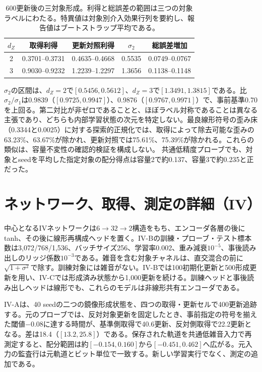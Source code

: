 \begin{table}[h]
\centering\small
\caption{600更新後の三対象形成。利得と総誤差の範囲は三つの対象ラベルにわたる。特異値は対象別介入効果行列を要約し、報告値はブートストラップ平均である。}
\label{tab:three}
\begin{tabular}{ccccc}
\toprule
$d_Z$ & 取得利得 & 更新対照利得 & $\sigma_2$ & 総誤差増加\\
\midrule
2 & 0.3701--0.3731 & 0.4635--0.4668 & 0.5535 & 0.0749--0.0767\\
3 & 0.9030--0.9232 & 1.2239--1.2297 & 1.3656 & 0.1138--0.1148\\
\bottomrule
\end{tabular}
\end{table}

$\sigma_2$の区間は、$d_Z=2$で$[0.5456,0.5612]$、$d_Z=3$で$[1.3491,1.3815]$である。比$\sigma_2/\sigma_1$は0.9839（$[0.9725,0.9947]$）、0.9876（$[0.9767,0.9971]$）で、事前基準0.70を上回る。第二対比が非ゼロであることと、ほぼラベル対称であることは異なる主張であり、どちらも内部学習状態の次元を特定しない。最良線形符号の歪み床（0.3344と0.0025）に対する探索的正規化では、取得によって除去可能な歪みの63.23\%、63.67\%が除かれ、更新対照では75.61\%、75.39\%が除かれる。これらの類似は、容量不変性の確認的検証を構成しない。 共通低精度プローブでも、対象とseedを平均した指定対象の配分得点は容量2で約0.137、容量3で約0.235と正だった。


\section{ネットワーク、取得、測定の詳細（IV）}
\label{app:measurement}
中心となるIVネットワークは$6\to32\to2$構造をもち、エンコーダ各層の後にtanh、その後に線形再構成ヘッドを置く。IV-Bの訓練・プローブ・テスト標本数は3,072/768/1,536、バッチサイズ256、学習率0.002、重み減衰$10^{-5}$、事後読み出しのリッジ係数$10^{-3}$である。雑音を含む対象チャネルは、直交混合の前に$\sqrt{1+\sigma^2}$で除す。訓練対象には雑音がない。IV-Bでは100初期化更新と500形成更新を用い、IV-Cでは形成済み状態から1,000更新を続ける。訓練ヘッドと事後読み出しヘッドは線形でも、これらのモデルは非線形共有エンコーダである。

IV-Aは、40 seedの二つの鏡像形成状態を、四つの取得・更新セルで400更新追跡する。元のプローブでは、反対対象更新を固定したとき、事前指定の符号を揃えた閾値$-0.08$に達する時間が、基準側取得で40.6更新、反対側取得で22.2更新となる。差は18.4（$[13.2,25.8]$）である。保存された軌道を共通低雑音入力で再測定すると、配分範囲は約$[-0.154,0.160]$から$[-0.451,0.462]$へ広がる。元入力の監査行は元軌道とビット単位で一致する。新しい学習実行でなく、測定の追加である。

